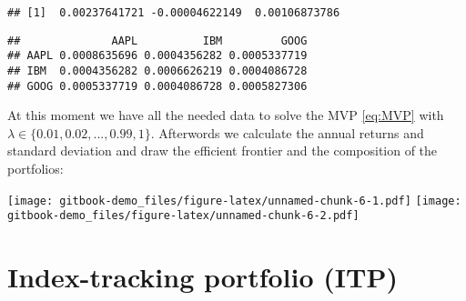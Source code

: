 \documentclass[
  oneside]{book}
\newenvironment{Shaded}{\begin{snugshade}}{\end{snugshade}}
\newcommand{\FunctionTok}[1]{\textcolor[rgb]{0.00,0.00,0.00}{#1}}
\newcommand{\NormalTok}[1]{#1}
\newcommand{\OtherTok}[1]{\textcolor[rgb]{0.56,0.35,0.01}{#1}}
\newcommand{\SpecialCharTok}[1]{\textcolor[rgb]{0.00,0.00,0.00}{#1}}
\begin{document}
\begin{verbatim}
## [1]  0.00237641721 -0.00004622149  0.00106873786
\end{verbatim}

\begin{Shaded}
\end{Shaded}

\begin{verbatim}
##              AAPL          IBM         GOOG
## AAPL 0.0008635696 0.0004356282 0.0005337719
## IBM  0.0004356282 0.0006626219 0.0004086728
## GOOG 0.0005337719 0.0004086728 0.0005827306
\end{verbatim}

At this moment we have all the needed data to solve the MVP \eqref{eq:MVP} with \(\lambda \in \{0.01, 0.02, ..., 0.99, 1\}\). Afterwords we calculate the annual returns and standard deviation and draw the efficient frontier and the composition of the portfolios:

\texttt{[image: gitbook-demo\_files/figure-latex/unnamed-chunk-6-1.pdf]} \texttt{[image: gitbook-demo\_files/figure-latex/unnamed-chunk-6-2.pdf]}

\hypertarget{index-tracking-portfolio-itp}{%
\section{Index-tracking portfolio (ITP)}\label{index-tracking-portfolio-itp}}
\end{document}
